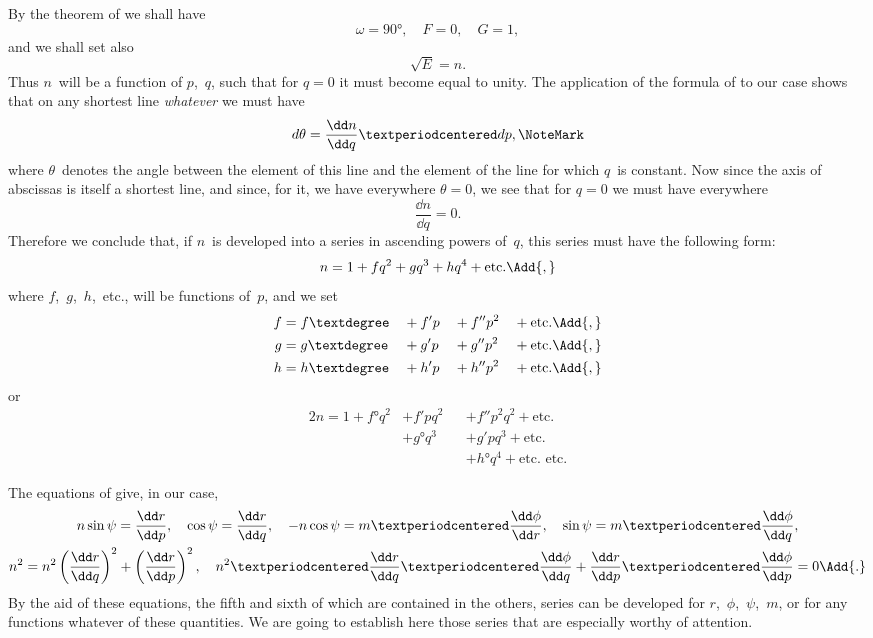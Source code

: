 By the theorem of  we shall have
\[
\omega = 90°,\quad
F = 0,\quad
G = 1,
\]
and we shall set also
\[
\sqrt{E} = n.
\]
Thus $n$~will be a function of $p$,~$q$, such that for $q = 0$ it must become equal to unity.
The application of the formula of  to our case shows that on any shortest
line \emph{whatever} we must have
\[
d\theta = \frac{\dd n}{\dd q}·dp,\NoteMark
\]
where $\theta$~denotes the angle between the element of this line and the element of the
line for which $q$~is constant. Now since the axis of abscissas is itself a shortest line,
and since, for it, we have everywhere $\theta = 0$, we see that for $q = 0$ we must have
everywhere
\[
\frac{\dd n}{\dd q} = 0.
\]
Therefore we conclude that, if $n$~is developed into a series in ascending powers of~$q$,
this series must have the following form:
\[
n = 1 + fq^{2} + gq^{3} + hq^{4} + \text{etc.}\Add{,}
\]
where $f$,~$g$,~$h$,~etc., will be functions of~$p$, and we set
\begin{alignat*}{4}
f &= f° &&+ f'p &&+ f''p^{2} &&+ \text{etc.}\Add{,} \\
g &= g° &&+ g'p &&+ g''p^{2} &&+ \text{etc.}\Add{,} \\
h &= h° &&+ h'p &&+ h''p^{2} &&+ \text{etc.}\Add{,}
\end{alignat*}
or
\begin{alignat*}{2}
n = 1 + f°q^{2} &+ f'pq^{2}   &&+ f''p^{2}q^{2} + \text{etc.} \\
                  &+ g° q^{3} &&+ g'pq^{3} + \text{etc.} \\
                  &             &&+ h°q^{4} + \text{etc.\ etc.}
\end{alignat*}



The equations of  give, in our case,
\begin{gather*}
 n\sin\psi = \frac{\dd r}{\dd p},\quad
  \cos\psi = \frac{\dd r}{\dd q},\quad
-n\cos\psi = m·\frac{\dd\phi}{\dd r},\quad
  \sin\psi = m·\frac{\dd\phi}{\dd q}, \\
%
n^{2} = n^{2}\left(\frac{\dd r}{\dd q}\right)^{2}
          + \left(\frac{\dd r}{\dd p}\right)^{2},\quad
n^{2}·\frac{\dd r}{\dd q}·\frac{\dd\phi}{\dd q}
      + \frac{\dd r}{\dd p}·\frac{\dd\phi}{\dd p} = 0\Add{.}
\end{gather*}
By the aid of these equations, the fifth and sixth of which are contained in the others,
series can be developed for $r$,~$\phi$,~$\psi$,~$m$, or for any functions whatever of these quantities.
We are going to establish here those series that are especially worthy of
attention.

